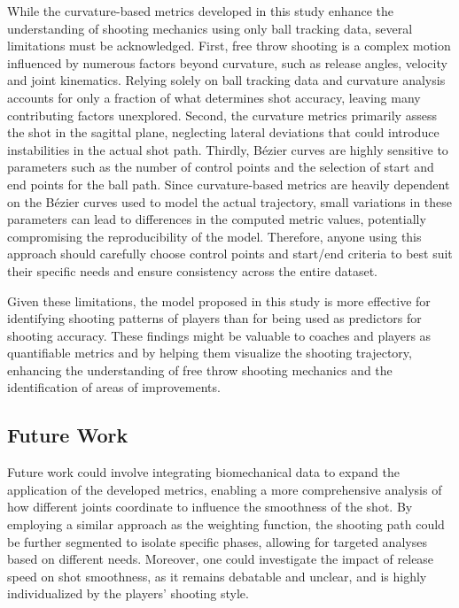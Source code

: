 \documentclass{article}
\begin{document}
      While the curvature-based metrics developed in this study enhance the understanding of shooting mechanics using only ball tracking data, several limitations must be acknowledged. First, free throw shooting is a complex motion influenced by numerous factors beyond curvature, such as release angles, velocity and joint kinematics. Relying solely on ball tracking data and curvature analysis accounts for only a fraction of what determines shot accuracy, leaving many contributing factors unexplored. Second, the curvature metrics primarily assess the shot in the sagittal plane, neglecting lateral deviations that could introduce instabilities in the actual shot path. Thirdly, Bézier curves are highly sensitive to parameters such as the number of control points and the selection of start and end points for the ball path. Since curvature-based metrics are heavily dependent on the Bézier curves used to model the actual trajectory, small variations in these parameters can lead to differences in the computed metric values, potentially compromising the reproducibility of the model. Therefore, anyone using this approach should carefully choose control points and start/end criteria to best suit their specific needs and ensure consistency across the entire dataset.

      Given these limitations, the model proposed in this study is more effective for identifying shooting patterns of players than for being used as predictors for shooting accuracy. These findings might be valuable to coaches and players as quantifiable metrics and by helping them visualize the shooting trajectory, enhancing the understanding of free throw shooting mechanics and the identification of areas of improvements.

    \subsection{Future Work}
    
      Future work could involve integrating biomechanical data to expand the application of the developed metrics, enabling a more comprehensive analysis of how different joints coordinate to influence the smoothness of the shot. By employing a similar approach as the weighting function, the shooting path could be further segmented to isolate specific phases, allowing for targeted analyses based on different needs. Moreover, one could investigate the impact of release speed on shot smoothness, as it remains debatable and unclear, and is highly individualized by the players' shooting style.  

  
\end{document}
